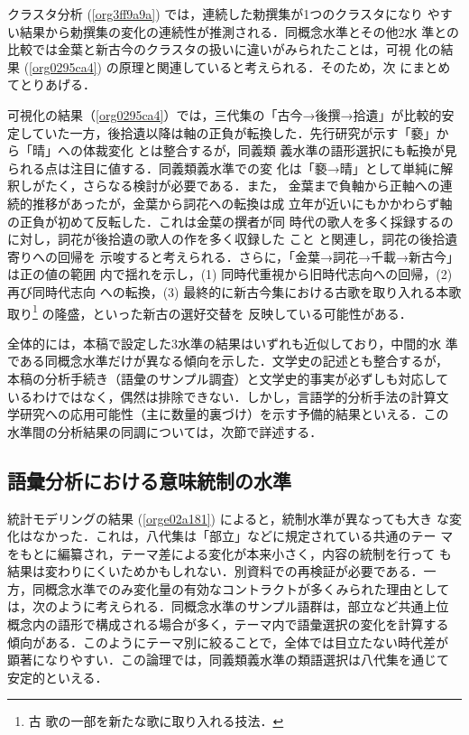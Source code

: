 \documentclass[submit]{ipsj}
\renewcommand{\ref}{\cref}
\begin{document}
クラスタ分析 (\ref{org3ff9a9a}) では，連続した勅撰集が1つのクラスタになり
やすい結果から勅撰集の変化の連続性が推測される．同概念水準とその他2水
準との比較では金葉と新古今のクラスタの扱いに違いがみられたことは，可視
化の結果 (\ref{org0295ca4}) の原理と関連していると考えられる．そのため，次
にまとめてとりあげる．

可視化の結果（\ref{org0295ca4}）では，三代集の「古今→後撰→拾遺」が比較的安
定していた一方，後拾遺以降は軸の正負が転換した．先行研究が示す「褻」か
ら「晴」への体裁変化 \cite{ueno1976Koshui} とは整合するが，同義類
義水準の語形選択にも転換が見られる点は注目に値する．同義類義水準での変
化は「褻→晴」として単純に解釈しがたく，さらなる検討が必要である．また，
金葉まで負軸から正軸への連続的推移があったが，金葉から詞花への転換は成
立年が近いにもかかわらず軸の正負が初めて反転した．これは金葉の撰者が同
時代の歌人を多く採録するのに対し，詞花が後拾遺の歌人の作を多く収録した
こと \cite{matsuda1939Shika} と関連し，詞花の後拾遺寄りへの回帰を
示唆すると考えられる．さらに，「金葉→詞花→千載→新古今」は正の値の範囲
内で揺れを示し，(1) 同時代重視から旧時代志向への回帰，(2) 再び同時代志向
への転換，(3) 最終的に新古今集における古歌を取り入れる本歌取り\footnote{古
歌の一部を新たな歌に取り入れる技法．} の隆盛，といった新古の選好交替を
反映している可能性がある．

全体的には，本稿で設定した3水準の結果はいずれも近似しており，中間的水
準である同概念水準だけが異なる傾向を示した．文学史の記述とも整合するが，
本稿の分析手続き（語彙のサンプル調査）と文学史的事実が必ずしも対応して
いるわけではなく，偶然は排除できない．しかし，言語学的分析手法の計算文
学研究への応用可能性（主に数量的裏づけ）を示す予備的結果といえる．この
水準間の分析結果の同調については，次節で詳述する．
\subsection{語彙分析における意味統制の水準\label{org77b4f08}}
\label{sec:orgbb3c6c9}
統計モデリングの結果 (\ref{orge02a181}) によると，統制水準が異なっても大き
な変化はなかった．これは，八代集は「部立」などに規定されている共通のテー
マをもとに編纂され，テーマ差による変化が本来小さく，内容の統制を行って
も結果は変わりにくいためかもしれない．別資料での再検証が必要である．一
方，同概念水準でのみ変化量の有効なコントラクトが多くみられた理由として
は，次のように考えられる．同概念水準のサンプル語群は，部立など共通上位
概念内の語形で構成される場合が多く，テーマ内で語彙選択の変化を計算する
傾向がある．このようにテーマ別に絞ることで，全体では目立たない時代差が
顕著になりやすい．この論理では，同義類義水準の類語選択は八代集を通じて
安定的といえる．
\end{document}
